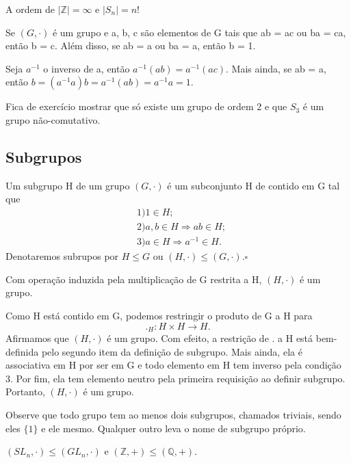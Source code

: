 \documentclass[Algebra/algebra_notes.tex]{subfiles}
\begin{document}
\begin{example*}
	A ordem de $|\mathbb{Z}| = \infty$ e $|S_{n}| = n!$ \qedsymbol
\end{example*}
\begin{prop*}
	Se $(G, \cdot)$ é um grupo e a, b, c são elementos de G tais que ab = ac ou ba = ca, então b = c. Além disso, se ab = a ou
	ba = a, então b = 1.
\end{prop*}
\begin{proof*}
	Seja $a^{-1}$ o inverso de a, então $a^{-1}(ab) = a^{-1}(ac).$ Mais ainda, se ab = a, então $b = (a^{-1}a)b = a^{-1}(ab) = a^{-1}a = 1.$
\end{proof*}
Fica de exercício mostrar que só existe um grupo de ordem 2 e que $S_{3}$ é um grupo não-comutativo.
\subsection{Subgrupos}
\begin{def*}
	Um subgrupo H de um grupo $(G, \cdot)$ é um subconjunto H de contido em G tal que
	\begin{align*}
		 & 1) 1\in H;                        \\
		 & 2) a, b\in H\Rightarrow ab \in H; \\
		 & 3) a\in H\Rightarrow a^{-1}\in H.
	\end{align*}
	Denotaremos subrupos por $H \leq{G}$ ou $(H, \cdot) \leq{(G, \cdot)}. \square$
\end{def*}
\begin{prop*}
	Com operação induzida pela multiplicação de G restrita a H, $(H, \cdot)$ é um grupo.
\end{prop*}
\begin{proof*}
	Como H está contido em G, podemos restringir o produto de G a H para
	$$
		._H:H \times H\rightarrow H.
	$$
	Afirmamos que $(H, \cdot)$ é um grupo. Com efeito, a restrição de . a H está bem-definida pelo segundo item da definição
	de subgrupo. Mais ainda, ela é associativa em H por ser em G e todo elemento em H tem inverso pela condição 3. Por fim,
	ela tem elemento neutro pela primeira requisição ao definir subgrupo. Portanto, $(H, \cdot)$ é um grupo.
\end{proof*}
Observe que todo grupo tem ao menos dois subgrupos, chamados triviais, sendo eles $\{1\}$ e ele mesmo. Qualquer outro leva o nome de
subgrupo próprio.
\begin{example*}
	$(SL_{n}, \cdot) \leq{(GL_{n}, \cdot)}$ e $(\mathbb{Z}, +) \leq{(\mathbb{Q}, +)}.$ \qedsymbol
\end{example*}
\end{document}

